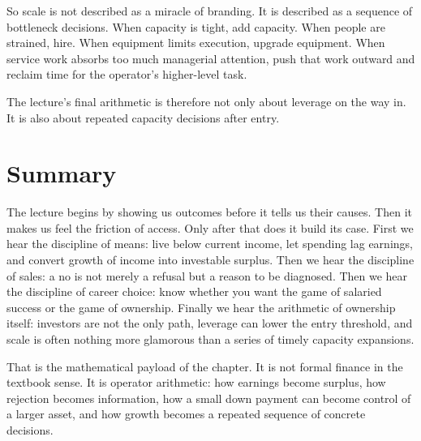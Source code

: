 So scale is not described as a miracle of branding. It is described as a sequence of bottleneck decisions. When capacity is tight, add capacity. When people are strained, hire. When equipment limits execution, upgrade equipment. When service work absorbs too much managerial attention, push that work outward and reclaim time for the operator's higher-level task.

The lecture's final arithmetic is therefore not only about leverage on the way in. It is also about repeated capacity decisions after entry.

\section{Summary}

The lecture begins by showing us outcomes before it tells us their causes. Then it makes us feel the friction of access. Only after that does it build its case. First we hear the discipline of means: live below current income, let spending lag earnings, and convert growth of income into investable surplus. Then we hear the discipline of sales: a no is not merely a refusal but a reason to be diagnosed. Then we hear the discipline of career choice: know whether you want the game of salaried success or the game of ownership. Finally we hear the arithmetic of ownership itself: investors are not the only path, leverage can lower the entry threshold, and scale is often nothing more glamorous than a series of timely capacity expansions.

That is the mathematical payload of the chapter. It is not formal finance in the textbook sense. It is operator arithmetic: how earnings become surplus, how rejection becomes information, how a small down payment can become control of a larger asset, and how growth becomes a repeated sequence of concrete decisions.